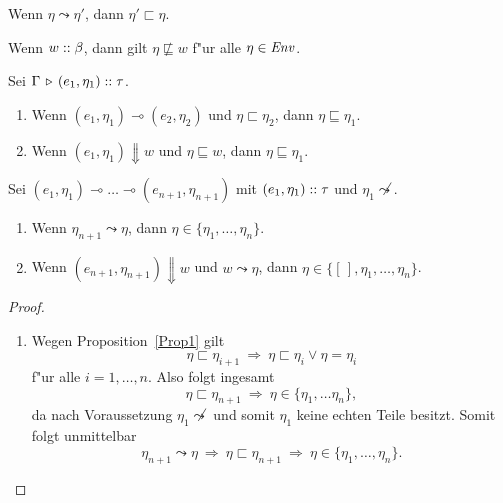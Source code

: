 \documentclass[12pt,fleqn,a4paper]{article}
\begin{document}
\begin{lemma}
  Wenn $\eta \leadsto \eta'$, dann $\eta' \sqsubset \eta$.
\end{lemma}

\begin{lemma}
  Wenn $w\mathrel{::}\beta$, dann gilt $\eta \not\sqsubseteq w$ f"ur alle $\eta \in {\text{\it Env\/}}$.
\end{lemma}

\begin{proposition} \label{Prop1}
  Sei $\Gamma \, \triangleright \, (e_1,\eta_1)\mathrel{::}\tau$.
  \begin{enumerate}
  \item Wenn $(e_1,\eta_1) \multimap (e_2,\eta_2)$ und $\eta \sqsubset \eta_2$, dann $\eta \sqsubseteq \eta_1$.
  \item Wenn $(e_1,\eta_1) \Downarrow w$ und $\eta \sqsubseteq w$, dann $\eta \sqsubseteq \eta_1$.
  \end{enumerate}
\end{proposition}

\begin{theorem}
  Sei $(e_1,\eta_1) \multimap \ldots \multimap (e_{n+1},\eta_{n+1})$ mit $(e_1,\eta_1)\mathrel{::}\tau$
  und $\eta_1 \not\leadsto$.
  \begin{enumerate}
  \item Wenn $\eta_{n+1} \leadsto \eta$, dann $\eta\in\{\eta_1,\ldots,\eta_n\}$.
  \item Wenn $(e_{n+1},\eta_{n+1}) \Downarrow w$ und $w \leadsto \eta$, dann $\eta\in\{[\,],\eta_1,\ldots,\eta_n\}$.
  \end{enumerate}
\end{theorem}

\begin{proof} \
  \begin{enumerate}
  \item Wegen Proposition~\ref{Prop1} gilt
    \[ \eta \sqsubset \eta_{i+1} \ \Rightarrow \ \eta \sqsubset \eta_i \vee \eta = \eta_i \]
    f"ur alle $i=1,\ldots,n$. Also folgt ingesamt
    \[ \eta \sqsubset \eta_{n+1} \ \Rightarrow \ \eta \in \{\eta_1,\ldots\eta_n\}, \]
    da nach Voraussetzung $\eta_1 \not\leadsto$ und somit $\eta_1$ keine echten Teile besitzt.
    Somit folgt unmittelbar
    \[ \eta_{n+1} \leadsto \eta
    \ \Rightarrow \ \eta \sqsubset \eta_{n+1}
    \ \Rightarrow \ \eta\in\{\eta_1,\ldots,\eta_n\}. \]
  \end{enumerate}
\end{proof}

\end{document}
